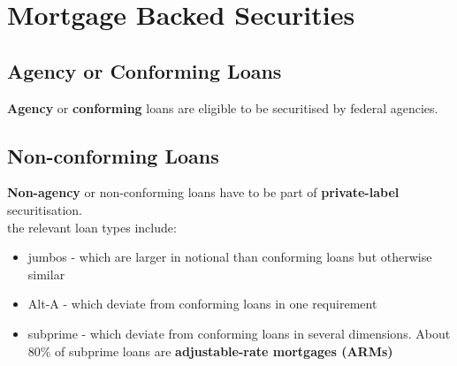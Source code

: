 \chapter{Mortgage Backed Securities}


\section{Agency or Conforming Loans}
\textbf{Agency} or \textbf{conforming} loans are eligible to be securitised by federal agencies.

\section{Non-conforming Loans}
\textbf{Non-agency} or {non-conforming} loans have to be part of \textbf{private-label} securitisation.\\
the relevant loan types include:
\begin{itemize}
	\item jumbos - which are larger in notional than conforming loans but otherwise similar
	\item Alt-A - which deviate from conforming loans in one requirement
	\item subprime - which deviate from conforming loans in several dimensions. About 80\% of subprime loans are \textbf{adjustable-rate mortgages (ARMs)}
\end{itemize}